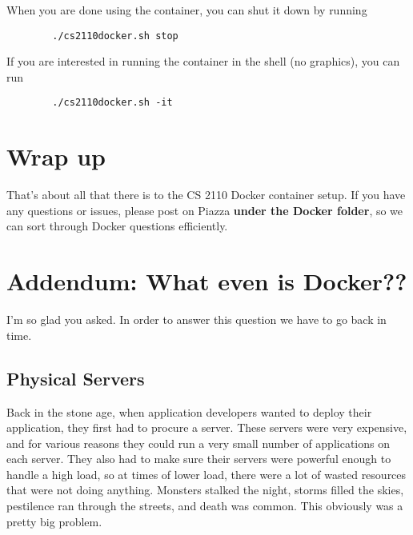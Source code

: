 When you are done using the container, you can shut it down by running

\begin{center}
    \begin{verbatim}
        ./cs2110docker.sh stop
    \end{verbatim}
\end{center}

If you are interested in running the container in the shell (no graphics), you can run

\begin{center}
    \begin{verbatim}
        ./cs2110docker.sh -it
    \end{verbatim}
\end{center}



\section{Wrap up}
That’s about all that there is to the CS 2110 Docker container setup. If you have any questions or issues, please post on Piazza \textbf{under the Docker folder}, so we can sort through Docker questions efficiently.

\section{Addendum: What even is Docker??}
I’m so glad you asked. In order to answer this question we have to go back in time.

\subsection{Physical Servers}
Back in the stone age, when application developers wanted to deploy their application, they first had to procure a server. These servers were very expensive, and for various reasons they could run a very small number of applications on each server. They also had to make sure their servers were powerful enough to handle a high load, so at times of lower load, there were a lot of wasted resources that were not doing anything. Monsters stalked the night, storms filled the skies, pestilence ran through the streets, and death was common. This obviously was a pretty big problem.

